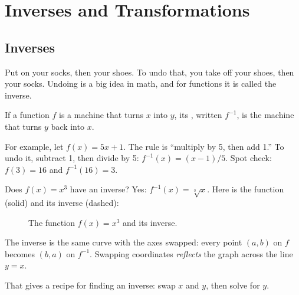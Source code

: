 \chapter{Inverses and Transformations}


\section{Inverses}

Put on your socks, then your shoes. To undo that, you take off your shoes,
then your socks. Undoing is a big idea in math, and for functions it is
called the inverse.

If a function $f$ is a machine that turns $x$ into $y$, its
, written $f^{-1}$, is the machine
that turns $y$ back into $x$.

For example, let $f(x) = 5x + 1$. The rule is ``multiply by 5, then add 1.''
To undo it, subtract 1, then divide by 5: $f^{-1}(x) = (x - 1)/5$. Spot
check: $f(3) = 16$ and $f^{-1}(16) = 3$.

Does $f(x) = x^3$ have an inverse? Yes: $f^{-1}(x) = \sqrt[3]{x}$. Here is
the function (solid) and its inverse (dashed):

\begin{figure}[H]
  \centering
  \caption{The function $f(x) = x^3$ and its inverse.}
  \label{fig:inv1}
\end{figure}


The inverse is the same curve with the axes swapped: every point $(a, b)$
on $f$ becomes $(b, a)$ on $f^{-1}$. Swapping coordinates
\emph{reflects} the graph across the line $y=x$.

That gives a recipe for finding an inverse: swap $x$ and $y$, then solve
for $y$.

